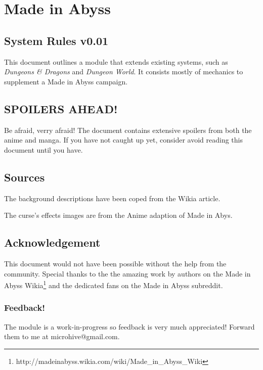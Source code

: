 
\chapter{Made in Abyss}

\section{System Rules v0.01}
This document outlines a module that extends existing systems, such as \textit{Dungeons \& Dragons} and \textit{Dungeon World}. It consists mostly of mechanics to supplement a Made in Abyss campaign.

\section{SPOILERS AHEAD!} 
Be afraid, verry afraid! The document contains extensive spoilers from both the anime and manga. If you have not caught up yet, consider avoid reading this document until you have. 

\section{Sources}
The background descriptions have been coped from the Wikia article. 


\newline The curse's effects images are from the Anime adaption of Made in Abys.

\section{Acknowledgement}
This document would not have been possible without the help from the community. Special thanks to the the amazing work by authors on the Made in Abyss Wikia\footnote{http://madeinabyss.wikia.com/wiki/Made\_in\_Abyss\_Wiki} and the dedicated fans on the Made in Abyss subreddit. 

\subsection{Feedback!}
The module is a work-in-progress so feedback is very much appreciated! Forward them to me at microhive@gmail.com.

